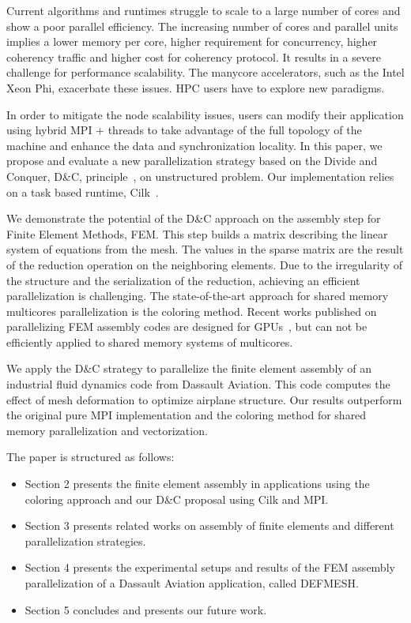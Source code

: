 \documentclass[10pt]{IOS-Book-Article}
\begin{document}
Current algorithms and runtimes struggle to scale to a large number of cores and show a poor parallel efficiency. 
The increasing number of cores and parallel units implies a lower memory per core, higher requirement for concurrency, 
higher coherency traffic and higher cost for coherency protocol.
It results in a severe challenge for performance scalability. The manycore accelerators, such as the Intel Xeon Phi, exacerbate these issues.
HPC users have to explore new paradigms.

In order to mitigate the node scalability issues, users can modify their application using hybrid MPI + threads to take advantage of the full topology of the machine
and enhance the data and synchronization locality.
In this paper, we propose and evaluate a new parallelization strategy  based on the Divide and Conquer, D\&C, principle~\cite{dc_specfem}, on unstructured problem. Our implementation relies on a task based runtime,
Cilk~\cite{cilk5}. 

We demonstrate the potential of the D\&C approach on the assembly step for Finite Element Methods, FEM.
This step builds a matrix describing the linear system of equations from the mesh.
The values in the sparse matrix are the result of the reduction operation on the neighboring elements.
Due to the irregularity of the structure and the serialization of the reduction, achieving an efficient parallelization is challenging. 
The state-of-the-art approach for shared memory multicores parallelization is the coloring method.
Recent works published on parallelizing FEM assembly codes are designed for GPUs~\cite{cecka2011assembly,CPUGPUasm}, but can not be efficiently applied to shared memory systems of multicores.

We apply the D\&C strategy to parallelize the finite element assembly of an industrial fluid dynamics code from Dassault Aviation.
This code computes the effect of mesh deformation to optimize airplane structure.
Our results outperform the original pure MPI implementation and the coloring method for shared memory parallelization and vectorization.

The paper is structured as follows:
\begin{itemize}
\item Section 2 presents the finite element assembly in applications using the coloring approach and our D\&C proposal using Cilk and MPI.
\item Section 3 presents related works on assembly of finite elements and different parallelization strategies.
\item Section 4 presents the experimental setups and results of the FEM assembly parallelization of a Dassault Aviation application, called DEFMESH.
\item Section 5 concludes and presents our future work.
\end{itemize}
\end{document}
